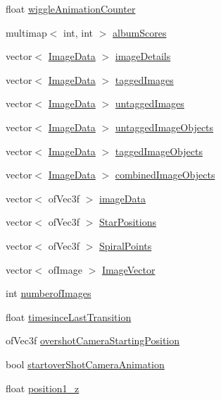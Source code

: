 \begin{DoxyCompactItemize}
float \hyperlink{classtest_app_a6073b33be7847d675ec089a1d514c506}{wiggle\-Animation\-Counter}
\item 
multimap$<$ int, int $>$ \hyperlink{classtest_app_aa16e3bba73f9adb3c6363ac429e5a472}{album\-Scores}
\item 
vector$<$ \hyperlink{struct_image_data}{Image\-Data} $>$ \hyperlink{classtest_app_adcd4c3dfc7257326a79e6a3fc8b33406}{image\-Details}
\item 
vector$<$ \hyperlink{struct_image_data}{Image\-Data} $>$ \hyperlink{classtest_app_a7f7226fc54fdb7d06366ed0fa3ab7ee3}{tagged\-Images}
\item 
vector$<$ \hyperlink{struct_image_data}{Image\-Data} $>$ \hyperlink{classtest_app_a9cb9aa0700c4c8b316329a86c4e650ec}{untagged\-Images}
\item 
vector$<$ \hyperlink{struct_image_data}{Image\-Data} $>$ \hyperlink{classtest_app_ae31cc868f554f62b4c6e4e9db3b4155b}{untagged\-Image\-Objects}
\item 
vector$<$ \hyperlink{struct_image_data}{Image\-Data} $>$ \hyperlink{classtest_app_af65c8dc2f4620bfe7fdf6a39043cb48d}{tagged\-Image\-Objects}
\item 
vector$<$ \hyperlink{struct_image_data}{Image\-Data} $>$ \hyperlink{classtest_app_aced9b8a8419c8465877c2c9cd43f8934}{combined\-Image\-Objects}
\item 
vector$<$ of\-Vec3f $>$ \hyperlink{classtest_app_a500cd1228b3364bf30c8fb185e375688}{image\-Data}
\item 
vector$<$ of\-Vec3f $>$ \hyperlink{classtest_app_a68d0d30cea64a9d39a1b2deef16677ad}{Star\-Positions}
\item 
vector$<$ of\-Vec3f $>$ \hyperlink{classtest_app_af0dd2f3e3aabdb43bee49d74c156dc05}{Spiral\-Points}
\item 
vector$<$ of\-Image $>$ \hyperlink{classtest_app_ad4de5d6e6e8f3b8bb7424e62792deb1f}{Image\-Vector}
\item 
int \hyperlink{classtest_app_a957cf7fdb3ea964a88ca1be13e4d68fc}{numberof\-Images}
\item 
float \hyperlink{classtest_app_acb60fb8a89e9ec5d461630a20b11ceda}{timesince\-Last\-Transition}
\item 
of\-Vec3f \hyperlink{classtest_app_a846feea7c2c4d4b1929bb72c546b3e19}{overshot\-Camera\-Starting\-Position}
\item 
bool \hyperlink{classtest_app_ad2fca6ce5e37462cd820afc48633324d}{startover\-Shot\-Camera\-Animation}
\item 
float \hyperlink{classtest_app_a808376783cdf510335cd1b37026e9bb3}{position1\-\_\-z}

\end{DoxyCompactItemize}
